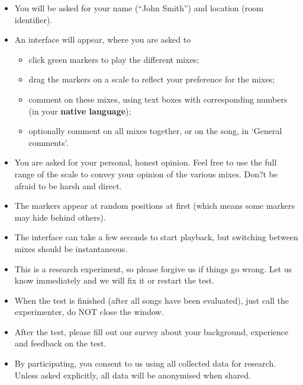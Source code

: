 \documentclass[11pt, oneside]{article}   	%
\begin{document}
	\begin{itemize}
		\item You will be asked for your name (``John Smith'') and location (room identifier). 
		\item An interface will appear, where you are asked to 
		\begin{itemize}
			\item click green markers to play the different mixes;
			\item drag the markers on a scale to reflect your preference for the mixes;
			\item comment on these mixes, using text boxes with corresponding numbers (in your \textbf{native language});
			\item optionally comment on all mixes together, or on the song, in `General comments'. 
		\end{itemize}
		\item You are asked for your personal, honest opinion. Feel free to use the full range of the scale to convey your opinion of the various mixes. Don?t be afraid to be harsh and direct. 
		\item The markers appear at random positions at first (which means some markers may hide behind others). 
		\item The interface can take a few seconds to start playback, but switching between mixes should be instantaneous. 
		\item This is a research experiment, so please forgive us if things go wrong. Let us know immediately and we will fix it or restart the test.  
		\item When the test is finished (after all songs have been evaluated), just call the experimenter, do NOT close the window.  
		\item After the test, please fill out our survey about your background, experience and feedback on the test. 
		\item By participating, you consent to us using all collected data for research. Unless asked explicitly, all data will be anonymised when shared. 
	\end{itemize}

\clearpage
\end{document}
